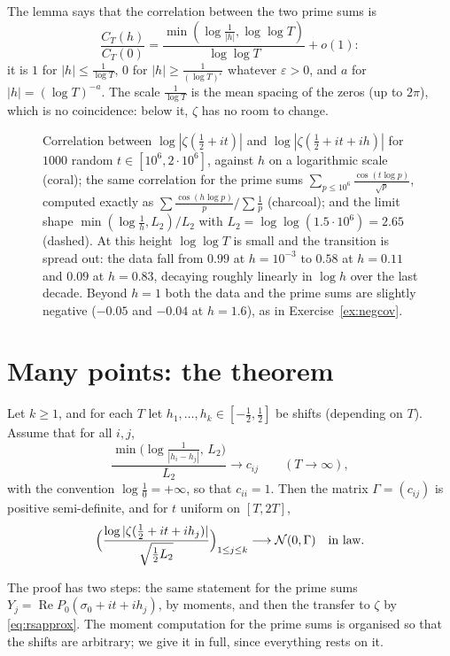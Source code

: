 The lemma says that the correlation between the two prime sums is
\[
\frac{C_T(h)}{C_T(0)}=\frac{\min(\log\frac1{|h|},\log\log T)}{\log\log T}+o(1):
\]
it is $1$ for $|h|\le\frac1{\log T}$, $0$ for $|h|\ge\frac1{(\log T)^{\varepsilon}}$ whatever $\varepsilon>0$, and $a$ for $|h|=(\log T)^{-a}$. The scale $\frac1{\log T}$ is the mean spacing of the zeros (up to $2\pi$), which is no coincidence: below it, $\zeta$ has no room to change.

\begin{figure}[ht]\centering{}
\caption{Correlation between $\log|\zeta(\frac12+it)|$ and $\log|\zeta(\frac12+it+ih)|$ for $1000$ random $t\in[10^6,2\cdot10^6]$, against $h$ on a logarithmic scale (coral); the same correlation for the prime sums $\sum_{p\le10^6}\frac{\cos(t\log p)}{\sqrt p}$, computed exactly as $\sum\frac{\cos(h\log p)}p/\sum\frac1p$ (charcoal); and the limit shape $\min(\log\frac1h,L_2)/L_2$ with $L_2=\log\log(1.5\cdot10^6)=2.65$ (dashed). At this height $\log\log T$ is small and the transition is spread out: the data fall from $0.99$ at $h=10^{-3}$ to $0.58$ at $h=0.11$ and $0.09$ at $h=0.83$, decaying roughly linearly in $\log h$ over the last decade. Beyond $h=1$ both the data and the prime sums are slightly negative ($-0.05$ and $-0.04$ at $h=1.6$), as in Exercise~\ref{ex:negcov}.}
\label{fig:correlation}
\end{figure}

\section{Many points: the theorem}

\begin{theorem}\label{thm:multipoint}
Let $k\ge1$, and for each $T$ let $h_1,\dots,h_k\in[-\frac12,\frac12]$ be shifts (depending on $T$). Assume that for all $i,j$,
\[
\frac{\min\bigl(\log\frac1{|h_i-h_j|},\,L_2\bigr)}{L_2}\longrightarrow c_{ij}\qquad(T\to\infty),
\]
with the convention $\log\frac10=+\infty$, so that $c_{ii}=1$. Then the matrix $\Gamma=(c_{ij})$ is positive semi-definite, and for $t$ uniform on $[T,2T]$,
\[
\Bigl(\frac{\log|\zeta(\frac12+it+ih_j)|}{\sqrt{\frac12L_2}}\Bigr)_{1\le j\le k}\longrightarrow\mathcal N(0,\Gamma)\quad\text{in law}.
\]
\end{theorem}

The proof has two steps: the same statement for the prime sums $Y_j=\operatorname{Re}P_0(\sigma_0+it+ih_j)$, by moments, and then the transfer to $\zeta$ by \eqref{eq:rsapprox}. The moment computation for the prime sums is organised so that the shifts are arbitrary; we give it in full, since everything rests on it.

